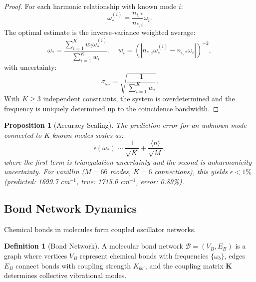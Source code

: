 \documentclass[twocolumn,10pt]{article}
\newtheorem{proposition}[theorem]{Proposition}
\theoremstyle{definition}
\newtheorem{definition}[theorem]{Definition}
\begin{document}
\begin{proof}
For each harmonic relationship with known mode $i$:
\begin{equation}
    \omega_*^{(i)} = \frac{n_{i,*}}{n_{*,i}}\omega_i.
\end{equation}
The optimal estimate is the inverse-variance weighted average:
\begin{equation}\label{eq:freq_estimate}
    \omega_* = \frac{\sum_{i=1}^{K} w_i\omega_*^{(i)}}{\sum_{i=1}^{K} w_i}, \quad w_i = \left(|n_{*,i}\omega_*^{(i)} - n_{i,*}\omega_i|\right)^{-2},
\end{equation}
with uncertainty:
\begin{equation}
    \sigma_{\omega_*} = \sqrt{\frac{1}{\sum_{i=1}^{K} w_i}}.
\end{equation}
With $K \geq 3$ independent constraints, the system is overdetermined and the frequency is uniquely determined up to the coincidence bandwidth.
\end{proof}

\begin{proposition}[Accuracy Scaling]\label{prop:accuracy}
The prediction error for an unknown mode connected to $K$ known modes scales as:
\begin{equation}\label{eq:accuracy_scaling}
    \epsilon(\omega_*) \sim \frac{1}{\sqrt{K}} + \frac{\langle n\rangle}{\sqrt{M}},
\end{equation}
where the first term is triangulation uncertainty and the second is anharmonicity uncertainty. For vanillin ($M = 66$ modes, $K = 6$ connections), this yields $\epsilon < 1\%$ (predicted: 1699.7 cm$^{-1}$, true: 1715.0 cm$^{-1}$, error: 0.89\%).
\end{proposition}

\subsection{Bond Network Dynamics}

Chemical bonds in molecules form coupled oscillator networks.

\begin{definition}[Bond Network]\label{def:bond_network}
A molecular bond network $\mathcal{B} = (V_B, E_B)$ is a graph where vertices $V_B$ represent chemical bonds with frequencies $\{\omega_b\}$, edges $E_B$ connect bonds with coupling strength $K_{bb'}$, and the coupling matrix $\mathbf{K}$ determines collective vibrational modes.
\end{definition}
\end{document}
